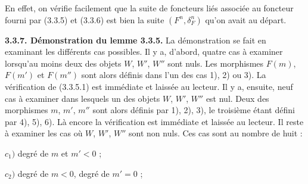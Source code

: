 En effet, on vérifie facilement que la suite de foncteurs liés associée au
foncteur fourni par (3.3.5) et (3.3.6) est bien la suite
$(F^n,\delta_F^n)$ qu'on avait au départ.

\medskip\noindent\textbf{3.3.7. Démonstration du lemme 3.3.5.}\quad
La démonstration se fait en examinant les différents cas possibles. Il y a,
d'abord, quatre cas à examiner lorsqu'au moins deux des objets $W$, $W'$,
$W''$ sont nuls. Les morphismes $F(m)$, $F(m')$ et $F(m'')$ sont alors
définis dans l'un des cas 1), 2) ou 3). La vérification de (3.3.5.1) est
immédiate et laissée au lecteur. Il y a, ensuite, neuf cas à examiner dans
lesquels un des objets $W$, $W'$, $W''$ est nul. Deux des morphismes
$m$, $m'$, $m''$ sont alors définis par 1), 2), 3), le troisième étant
défini par 4), 5), 6). Là encore la vérification est immédiate et laissée au
lecteur. Il reste à examiner les cas où $W$, $W'$, $W''$ sont non nuls.
Ces cas sont au nombre de huit :

\noindent$c_1)$ degré de $m$ et $m'<0$ ;

\noindent$c_2)$ degré de $m<0$, degré de $m'=0$ ;
\endgroup

